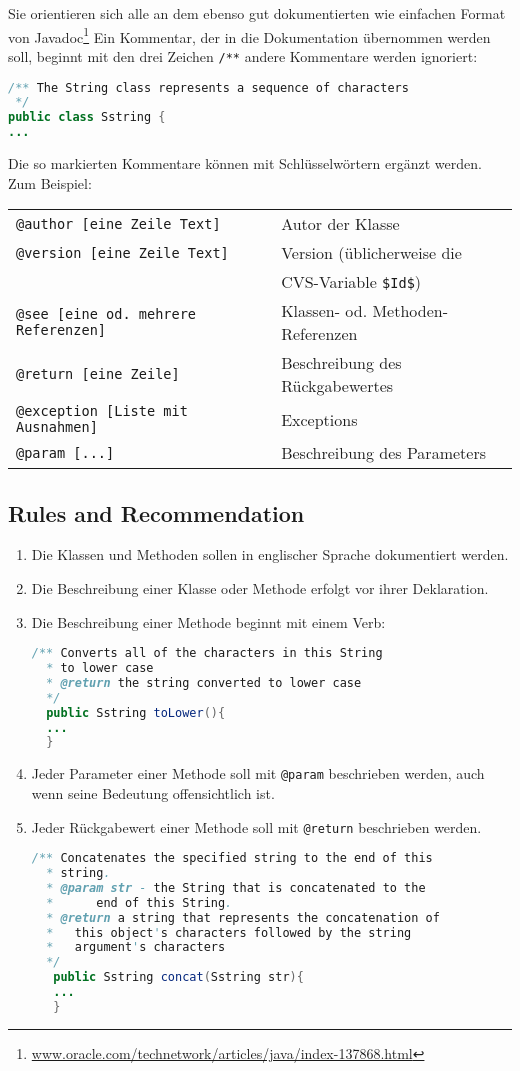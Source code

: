 \newslide
Sie orientieren sich alle
an dem ebenso gut dokumentierten wie einfachen Format von
Javadoc\footnote{\href{http://www.oracle.com/technetwork/articles/java/index-137868.html}
     {www.oracle.com/technetwork/articles/java/index-137868.html}}
Ein Kommentar, der in die Dokumentation übernommen werden soll,
beginnt mit den drei Zeichen \verb+/**+ andere Kommentare
  werden ignoriert:
\begin{lstlisting}[language=java]
/** The String class represents a sequence of characters
 */
public class Sstring {
...
\end{lstlisting}
\newslide
Die so markierten Kommentare können mit Schlüsselwörtern ergänzt werden.
Zum Beispiel:\\[2ex]
\begin{tabular}{ll}
\verb+@author [eine Zeile Text]+ & Autor der Klasse \\
\verb+@version [eine Zeile Text]+ & Version (üblicherweise die \\
                                  & CVS-Variable \verb+$Id$+)\\
\verb+@see [eine od. mehrere Referenzen]+ & Klassen- od. Methoden-Referenzen  \\
\verb+@return [eine Zeile]+ & Beschreibung des Rückgabewertes \\
\verb+@exception [Liste mit Ausnahmen]+ & Exceptions \\
\verb+@param [...]+ & Beschreibung des Parameters \\
\end{tabular}
\newslide
\subsection{Rules and Recommendation}
\begin{enumerate}
\item Die Klassen und Methoden sollen in englischer Sprache dokumentiert werden.
\item Die Beschreibung einer Klasse oder Methode erfolgt vor ihrer Deklaration.
\item Die Beschreibung einer Methode beginnt mit einem Verb:
\begin{lstlisting}[language=java]
/** Converts all of the characters in this String
  * to lower case
  * @return the string converted to lower case
  */
  public Sstring toLower(){
  ...
  }
\end{lstlisting}
\item Jeder Parameter einer Methode soll mit \verb|@param| beschrieben werden,
 auch wenn seine Bedeutung offensichtlich ist.
\item Jeder Rückgabewert einer Methode soll mit \verb|@return| beschrieben
  werden.
\begin{lstlisting}[language=java]
/** Concatenates the specified string to the end of this
  * string.
  * @param str - the String that is concatenated to the
  *      end of this String.
  * @return a string that represents the concatenation of
  *   this object's characters followed by the string
  *   argument's characters
  */
   public Sstring concat(Sstring str){
   ...
   }
\end{lstlisting}
\end{enumerate}
\newslide

